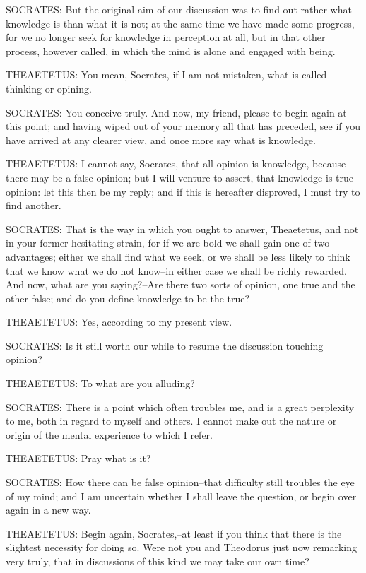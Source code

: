 SOCRATES: But the original aim of our discussion was to find out rather
what knowledge is than what it is not; at the same time we have made
some progress, for we no longer seek for knowledge in perception at all,
but in that other process, however called, in which the mind is alone
and engaged with being.

THEAETETUS: You mean, Socrates, if I am not mistaken, what is called
thinking or opining.

SOCRATES: You conceive truly. And now, my friend, please to begin
again at this point; and having wiped out of your memory all that has
preceded, see if you have arrived at any clearer view, and once more say
what is knowledge.

THEAETETUS: I cannot say, Socrates, that all opinion is knowledge,
because there may be a false opinion; but I will venture to assert, that
knowledge is true opinion: let this then be my reply; and if this is
hereafter disproved, I must try to find another.

SOCRATES: That is the way in which you ought to answer, Theaetetus, and
not in your former hesitating strain, for if we are bold we shall gain
one of two advantages; either we shall find what we seek, or we shall be
less likely to think that we know what we do not know--in either case we
shall be richly rewarded. And now, what are you saying?--Are there
two sorts of opinion, one true and the other false; and do you define
knowledge to be the true?

THEAETETUS: Yes, according to my present view.

SOCRATES: Is it still worth our while to resume the discussion touching
opinion?

THEAETETUS: To what are you alluding?

SOCRATES: There is a point which often troubles me, and is a great
perplexity to me, both in regard to myself and others. I cannot make out
the nature or origin of the mental experience to which I refer.

THEAETETUS: Pray what is it?

SOCRATES: How there can be false opinion--that difficulty still troubles
the eye of my mind; and I am uncertain whether I shall leave the
question, or begin over again in a new way.

THEAETETUS: Begin again, Socrates,--at least if you think that there is
the slightest necessity for doing so. Were not you and Theodorus just
now remarking very truly, that in discussions of this kind we may take
our own time?

